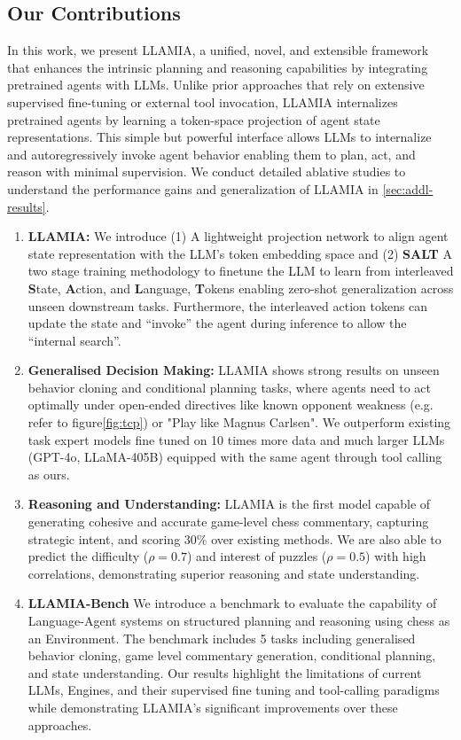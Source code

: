 \documentclass{article}
\theoremstyle{plain}
\theoremstyle{definition}
\theoremstyle{remark}
\begin{document}
\subsection{Our Contributions}
In this work, we present LLAMIA, a unified, novel, and extensible framework that enhances the intrinsic planning and reasoning capabilities by integrating pretrained agents with LLMs. Unlike prior approaches that rely on extensive supervised fine-tuning or external tool invocation, LLAMIA internalizes pretrained agents by learning a token-space projection of agent state representations. This simple but powerful interface allows LLMs to internalize and autoregressively invoke agent behavior enabling them to plan, act, and reason with minimal supervision. We conduct detailed ablative studies to understand the performance gains and generalization of LLAMIA in \ref{sec:addl-results}.

\begin{enumerate}[leftmargin=*, labelsep=0.5em]
    \item \textbf{LLAMIA:} We introduce (1) A lightweight projection network to align agent state representation with the LLM’s token embedding space and (2) \textbf{SALT} A two stage training methodology to finetune the LLM to learn from interleaved \textbf{S}tate, \textbf{A}ction, and \textbf{L}anguage, \textbf{T}okens enabling zero-shot generalization across unseen downstream tasks. Furthermore, the interleaved action tokens can update the state and ``invoke'' the agent during inference to allow the ``internal search''.
    \item \textbf{Generalised Decision Making:} LLAMIA shows strong results on unseen behavior cloning and conditional planning tasks, where agents need to act optimally under open-ended directives like known opponent weakness (e.g. refer to figure\ref{fig:tcp}) or "Play like Magnus Carlsen". We outperform existing task expert models fine tuned on 10 times more data and much larger LLMs (GPT-4o, LLaMA-405B) equipped with the same agent through tool calling as ours.
    \item \textbf{Reasoning and Understanding:} LLAMIA is the first model capable of generating cohesive and accurate game-level chess commentary, capturing strategic intent, and scoring 30\% over existing methods. We are also able to predict the difficulty ($\rho =0.7$) and interest of puzzles ($\rho =0.5$) with high correlations, demonstrating superior reasoning and state understanding.
    \item \textbf{LLAMIA-Bench} We introduce a benchmark to evaluate the capability of Language-Agent systems on structured planning and reasoning using chess as an Environment. The benchmark includes 5 tasks including generalised behavior cloning, game level commentary generation, conditional planning, and state understanding. Our results highlight the limitations of current LLMs, Engines, and their supervised fine tuning and tool-calling paradigms while demonstrating LLAMIA's significant improvements over these approaches.

\end{enumerate}
\end{document}
